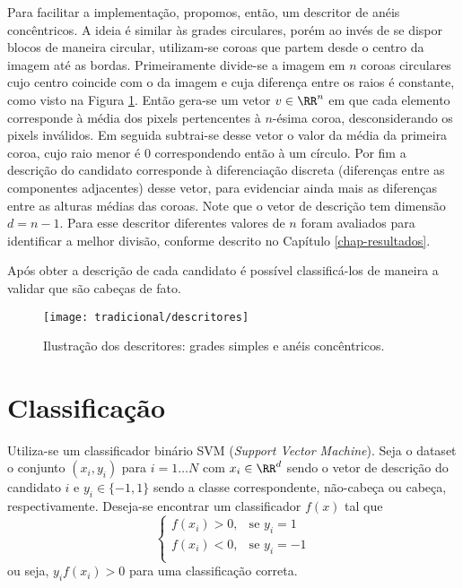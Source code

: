 Para facilitar a implementação, propomos, então, um descritor de anéis concêntricos. A ideia é similar às grades circulares, porém ao invés de se dispor blocos de maneira circular, utilizam-se coroas que partem desde o centro da imagem até as bordas. Primeiramente divide-se a imagem em $n$ coroas circulares cujo centro coincide com o da imagem e cuja diferença entre os raios é constante, como visto na Figura \ref{fig:descritores}. Então gera-se um vetor $v \in \RR^n$ em que cada elemento corresponde à média dos pixels pertencentes à $n$-ésima coroa, desconsiderando os pixels inválidos. Em seguida subtrai-se desse vetor o valor da média da primeira coroa, cujo raio menor é 0 correspondendo então à um círculo. Por fim a descrição do candidato corresponde à diferenciação discreta (diferenças entre as componentes adjacentes) desse vetor, para evidenciar ainda mais as diferenças entre as alturas médias das coroas. Note que o vetor de descrição tem dimensão $d=n-1$. Para esse descritor diferentes valores de $n$ foram avaliados para identificar a melhor divisão, conforme descrito no Capítulo \ref{chap-resultados}.

Após obter a descrição de cada candidato é possível classificá-los de maneira a validar que são cabeças de fato.

\begin{figure}[h]
\centering
\texttt{[image: tradicional/descritores]}
\caption{Ilustração dos descritores: grades simples e anéis concêntricos.}
\label{fig:descritores}
\end{figure}

\section{Classificação}
\label{sec:classificacao:svm}

Utiliza-se um classificador binário SVM (\textit{Support Vector Machine}). Seja o dataset o conjunto $(x_i, y_i)$ para $i=1 \dots N$ com $x_i \in \RR^d$ sendo o vetor de descrição do candidato $i$ e $y_i \in \{-1, 1\}$ sendo a classe correspondente, não-cabeça ou cabeça, respectivamente. Deseja-se encontrar um classificador $f(x)$ tal que 
\begin{equation*}
\label{eq:svm-decision}
	\begin{cases}
		f(x_i)>0,& \text{se } y_i=1 \\
		f(x_i)<0,& \text{se } y_i=-1 \\
	\end{cases}
\end{equation*}
 ou seja, $y_i f(x_i) > 0$ para uma classificação correta. 

